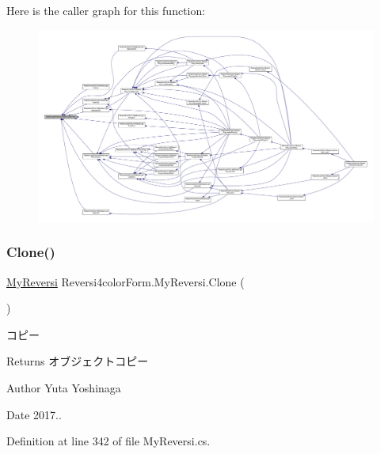 Here is the caller graph for this function\+:
\nopagebreak
\begin{figure}[H]
\begin{center}
\leavevmode
\includegraphics[width=350pt]{class_reversi4color_form_1_1_my_reversi_a02c145ac89302f2360cdb0c0391a38ce_icgraph}
\end{center}
\end{figure}
\mbox{\label{class_reversi4color_form_1_1_my_reversi_a45ce9de1a7d3209c2ad6c256ad1c4fe8}} 
\subsubsection{\texorpdfstring{Clone()}{Clone()}}
{\footnotesize\ttfamily \hyperlink{class_reversi4color_form_1_1_my_reversi}{My\+Reversi} Reversi4color\+Form.\+My\+Reversi.\+Clone (\begin{DoxyParamCaption}{ }\end{DoxyParamCaption})}



コピー 

\begin{DoxyReturn}{Returns}
オブジェクトコピー 
\end{DoxyReturn}
\begin{DoxyAuthor}{Author}
Yuta Yoshinaga 
\end{DoxyAuthor}
\begin{DoxyDate}{Date}
2017.. 
\end{DoxyDate}


Definition at line 342 of file My\+Reversi.\+cs.

